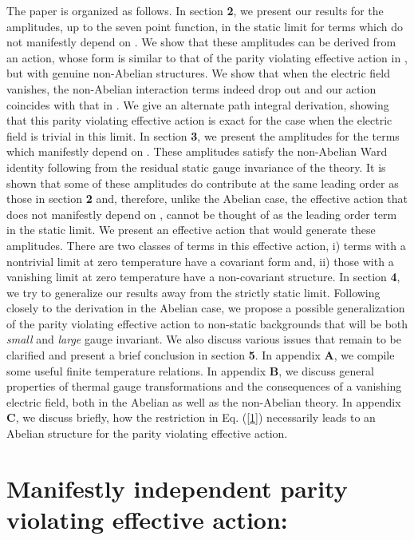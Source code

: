 \documentclass[a4paper,12pt]{article}
\begin{document}
The paper is organized as follows. In section {\bf 2}, we present our
results for the amplitudes, up to the seven point function, in the
static limit for terms which do not manifestly depend on \coordHE{}. We
show  that these
amplitudes can be derived from an action, whose form is similar to that
of the parity violating effective action in \cite{fosco:1997vu},
but with genuine non-Abelian structures. We show that when the electric field
vanishes, the non-Abelian interaction terms indeed drop out and our
action coincides  with that in
\cite{fosco:1997vu}.  We give an
alternate  path integral derivation,
showing that this parity violating effective action is exact for the 
case when the electric field is trivial in this limit. In
section {\bf 3}, we present the amplitudes for the terms which
manifestly depend on \coordHE{}. These amplitudes satisfy the
non-Abelian Ward identity following from the residual static gauge
invariance of the theory. It is shown that some of these amplitudes do
contribute at the same leading order as those in section {\bf 2} and,
therefore, unlike the Abelian case, the effective action that does not
manifestly depend on \coordHE{}, cannot be thought of as the leading
order  term in 
the static limit. We present an effective action that would generate 
these amplitudes. There are two classes of terms in this effective
action, i) terms with a nontrivial limit at zero temperature have a 
covariant form and, ii) those with a vanishing limit at zero 
temperature have a non-covariant structure. In section {\bf 4},
we try to generalize our results away from the strictly static limit.
Following closely to the derivation in the Abelian case, we propose a
possible generalization of the parity 
violating effective action to non-static backgrounds that will be
both {\it small} and {\it large} gauge invariant. We also discuss
various issues that remain to be clarified and present a brief
conclusion in section {\bf 5}. In 
appendix {\bf A}, we compile some useful finite temperature relations.
In appendix {\bf B}, we discuss general
properties of thermal gauge transformations and the consequences of a
vanishing electric field, both in the Abelian as well as the
non-Abelian theory. In appendix {\bf C}, we discuss briefly,
how the restriction in Eq. (\ref{1}) necessarily leads to an Abelian
structure for the parity violating effective action.

\section{Manifestly \coordHE{} independent parity violating effective
action:} 
\end{document}
